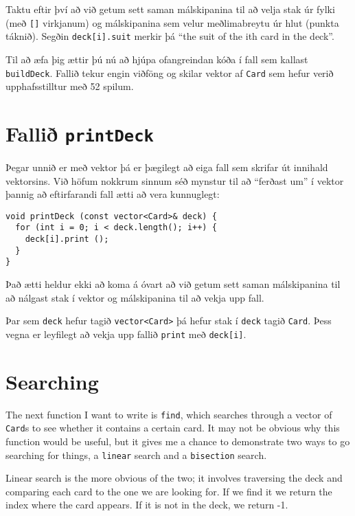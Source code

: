 
Taktu eftir því að við getum sett saman málskipanina til að velja stak úr fylki (með {\tt []} virkjanum)
og málskipanina sem velur meðlimabreytu úr hlut (punkta táknið).
Segðin {\tt deck[i].suit} merkir þá ``the suit of the ith card in the deck''.


Til að æfa þig ættir þú nú að hjúpa ofangreindan kóða í fall sem kallast {\tt buildDeck}.
Fallið tekur engin viðföng og skilar vektor af {\tt Card} sem hefur verið upphafsstilltur með 52 spilum.

\section{Fallið {\tt printDeck}}
\label{printdeck}

Þegar unnið er með vektor þá er þægilegt að eiga fall sem skrifar út innihald vektorsins.
Við höfum nokkrum sinnum séð mynstur til að ``ferðast um'' í vektor þannig að eftirfarandi fall ætti að vera kunnuglegt:

\begin{verbatim}
void printDeck (const vector<Card>& deck) {
  for (int i = 0; i < deck.length(); i++) {
    deck[i].print ();
  }
}
\end{verbatim}
%
Það ætti heldur ekki að koma á óvart að við getum sett saman málskipanina til að nálgast stak í vektor og málskipanina til að vekja upp fall.

Þar sem {\tt deck} hefur tagið {\tt vector<Card>} þá hefur stak í {\tt deck} tagið {\tt Card}.
Þess vegna er leyfilegt að vekja upp fallið {\tt print} með {\tt deck[i]}.

\section{Searching}
\label{find}

The next function I want to write is {\tt find}, which searches
through a vector of {\tt Card}s to see whether it contains a certain
card.  It may not be obvious why this function would be useful, but it
gives me a chance to demonstrate two ways to go searching for things,
a {\tt linear} search and a {\tt bisection} search.


Linear search is the more obvious of the two; it involves traversing
the deck and comparing each card to the one we are looking for.  If we
find it we return the index where the card appears.  If it is not in
the deck, we return -1.

